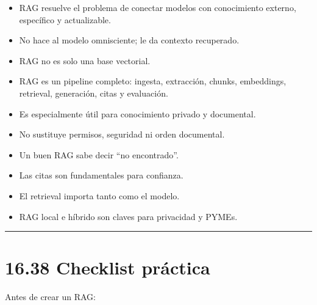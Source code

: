 \begin{itemize}
\tightlist
\item
  RAG resuelve el problema de conectar modelos con conocimiento externo,
  específico y actualizable.
\item
  No hace al modelo omnisciente; le da contexto recuperado.
\item
  RAG no es solo una base vectorial.
\item
  RAG es un pipeline completo: ingesta, extracción, chunks, embeddings,
  retrieval, generación, citas y evaluación.
\item
  Es especialmente útil para conocimiento privado y documental.
\item
  No sustituye permisos, seguridad ni orden documental.
\item
  Un buen RAG sabe decir ``no encontrado''.
\item
  Las citas son fundamentales para confianza.
\item
  El retrieval importa tanto como el modelo.
\item
  RAG local e híbrido son claves para privacidad y PYMEs.
\end{itemize}

\begin{center}\rule{0.5\linewidth}{0.5pt}\end{center}

\section{16.38 Checklist práctica}\label{checklist-pruxe1ctica-15}

Antes de crear un RAG:

